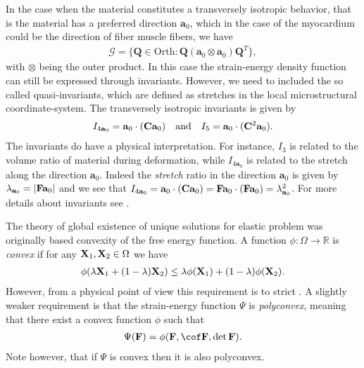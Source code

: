 In the case when the material constitutes a transversely isotropic
behavior, that is the material has a preferred direction $\mathbf{a}_0$,
which in the case of the myocardium could be the direction of fiber
muscle fibers, we have
\begin{align*}
  \mathcal{G} = \{ \mathbf{Q} \in \mathrm{Orth}: \mathbf{Q}(\mathbf{a}_0\otimes\mathbf{a}_0)\mathbf{Q}^T\},
\end{align*}
with $\otimes$ being the outer product. In this case the strain-energy
density function can still be expressed through invariants. However,
we need to included the so called quasi-invariants, which are defined
as stretches in the local microstructural coordinate-system. The
transversely isotropic invariants is given by
\begin{align*}
  I_{4\mathbf{a}_0 } = \mathbf{a}_0 \cdot (\mathbf{C} \mathbf{a}_0) && \text{and} && I_5 = \mathbf{a}_0 \cdot (\mathbf{C}^2 \mathbf{a}_0).
\end{align*}
The invariants do have a physical interpretation. For instance, $I_3$
is related to the volume ratio of material during deformation, while
$I_{4\mathbf{a}_0 } $ is related to the stretch along the direction
$\mathbf{a}_0 $. Indeed the \emph{stretch} ratio in the direction
$\mathbf{a}_0$ is given by $\lambda_{\mathbf{a}_0} = | \mathbf{F} \mathbf{a}_0
|$ and we see that $I_{4\mathbf{a}_0 }  =  \mathbf{a}_0 \cdot (\mathbf{C}
\mathbf{a}_0) = \mathbf{F} \mathbf{a}_0 \cdot (\mathbf{F} \mathbf{a}_0) =
\lambda_{\mathbf{a}_0}^2$. For more details about invariants see
\cite{holzapfel2009constitutive,liu1982representations}.


The theory of global existence of unique solutions for elastic problem
was originally based convexity of the free energy function.
A function $\phi: \Omega \rightarrow \mathbb{R}$ is \emph{convex} if for any
$\mathbf{X}_1, \mathbf{X}_2 \in \Omega$ we have
\begin{align}
  \phi(\lambda \mathbf{X}_1+ (1-\lambda) \mathbf{X}_2)
  \leq \lambda \phi(\mathbf{X}_1)
  + (1-\lambda) \phi(\mathbf{X}_2).
\end{align}
However, from a physical point of view this requirement is to strict
\cite{ball1976convexity}. A slightly weaker requirement is that the
strain-energy function $\Psi$ is \emph{polyconvex}, meaning that there exist
a convex function $\phi$ such that
\begin{align*}
  \Psi(\F) = \phi(\F, \cof \F, \det \F).
\end{align*}
Note however, that if $\Psi$ is convex then it is also polyconvex.


